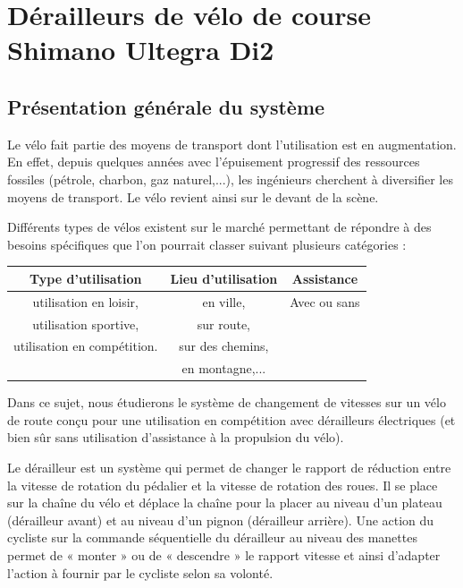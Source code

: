

\section{Dérailleurs de vélo de course Shimano Ultegra Di2}

\subsection{Présentation générale du système}

Le vélo fait partie des moyens de transport dont l'utilisation est en augmentation. En effet, depuis quelques années avec l'épuisement progressif des ressources fossiles (pétrole, charbon, gaz naturel,...), les ingénieurs cherchent à diversifier les moyens de transport. Le vélo revient ainsi sur le devant de la scène.

Différents types de vélos existent sur le marché permettant de répondre à des besoins spécifiques que l'on pourrait classer suivant plusieurs catégories :

\begin{center}
\begin{tabular}{|c|c|c|}
\hline
Type d'utilisation	& Lieu d'utilisation & Assistance\\
\hline
utilisation en loisir, & en ville, & Avec ou sans \\
utilisation sportive, & sur route, & \\
utilisation en compétition. & sur des chemins, & \\
& en montagne,... & \\
\hline
\end{tabular}
\end{center}

Dans ce sujet, nous étudierons le système de changement de vitesses sur un vélo de route conçu pour une utilisation en compétition avec dérailleurs électriques (et bien sûr sans utilisation d'assistance à la propulsion du vélo).

Le dérailleur est un système qui permet de changer le rapport de réduction entre la vitesse de rotation du pédalier et la vitesse de rotation des roues. Il se place sur la chaîne du vélo et déplace la chaîne pour la placer au niveau d'un plateau (dérailleur avant) et au niveau d'un pignon (dérailleur arrière). Une action du cycliste sur la commande séquentielle du dérailleur au niveau des manettes permet de « monter » ou de « descendre » le rapport vitesse et ainsi d'adapter l'action à fournir par le cycliste selon sa volonté.

